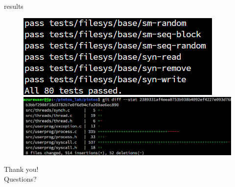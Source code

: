 \documentclass[10pt]{beamer}
\begin{document}
\begin{frame}[fragile]{results}
\begin{figure}
    \centering
    \includegraphics[width=\linewidth]{figures/result.png}
    \includegraphics[width=\linewidth]{figures/git.png}
\end{figure}
\end{frame}

\begin{frame}[standout]
  \Large Thank you!\\
  Questions?
\end{frame}
\end{document}
